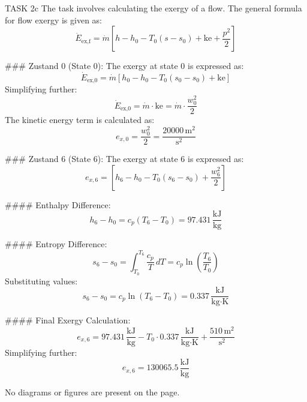 TASK 2c  
The task involves calculating the exergy of a flow. The general formula for flow exergy is given as:  
\[
\dot{E}_{\text{ex,f}} = \dot{m} \left[ h - h_0 - T_0 (s - s_0) + \text{ke} + \frac{p^2}{2} \right]
\]

### Zustand 0 (State 0):  
The exergy at state 0 is expressed as:  
\[
\dot{E}_{\text{ex,0}} = \dot{m} \left[ h_0 - h_0 - T_0 (s_0 - s_0) + \text{ke} \right]
\]  
Simplifying further:  
\[
\dot{E}_{\text{ex,0}} = \dot{m} \cdot \text{ke} = \dot{m} \cdot \frac{w_0^2}{2}
\]  
The kinetic energy term is calculated as:  
\[
e_{x,0} = \frac{w_0^2}{2} = \frac{20000 \, \text{m}^2}{\text{s}^2}
\]

### Zustand 6 (State 6):  
The exergy at state 6 is expressed as:  
\[
e_{x,6} = \left[ h_6 - h_0 - T_0 (s_6 - s_0) + \frac{w_6^2}{2} \right]
\]  

#### Enthalpy Difference:  
\[
h_6 - h_0 = c_p (T_6 - T_0) = 97.431 \, \frac{\text{kJ}}{\text{kg}}
\]

#### Entropy Difference:  
\[
s_6 - s_0 = \int_{T_0}^{T_6} \frac{c_p}{T} \, dT = c_p \ln \left( \frac{T_6}{T_0} \right)
\]  
Substituting values:  
\[
s_6 - s_0 = c_p \ln \left( T_6 - T_0 \right) = 0.337 \, \frac{\text{kJ}}{\text{kg·K}}
\]

#### Final Exergy Calculation:  
\[
e_{x,6} = 97.431 \, \frac{\text{kJ}}{\text{kg}} - T_0 \cdot 0.337 \, \frac{\text{kJ}}{\text{kg·K}} + \frac{510 \, \text{m}^2}{\text{s}^2}
\]  
Simplifying further:  
\[
e_{x,6} = 130065.5 \, \frac{\text{kJ}}{\text{kg}}
\]  

No diagrams or figures are present on the page.